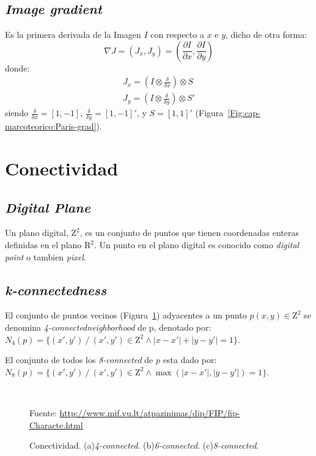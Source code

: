 \subsection{\textit{Image gradient}}
Es la primera derivada de la Imagen $I$ con respecto a $x$ e $y$, dicho de 
otra forma:
\begin{equation}
  \nabla J = (J_x, J_y) = \left( \frac{\partial I}{\partial x}, \frac{\partial I}{\partial y} \right)
\end{equation}
donde:
\begin{eqnarray}
  J_x = \left( I \otimes \frac{\delta}{\delta x} \right) \otimes S \\
  J_y = \left( I \otimes \frac{\delta}{\delta y} \right) \otimes S'
\end{eqnarray}
\noindent siendo $\frac{\delta}{\delta x} = [1, -1]$, $\frac{\delta}{\delta y} = [1, -1]'$, y $S = [1, 1]'$ (Figura~\ref{Fig:cap-marcoteorico:Paris-grad}).

\section{Conectividad}
\subsection{\textit{Digital Plane}}
Un plano digital\cite{Biswas:2010:IsoCovers}, $\mathrm{Z}^2$, es un conjunto 
de puntos que tienen coordenadas enteras definidas en el plano $\mathrm{R}^2$.
Un punto en el plano digital es conocido como \textit{digital point} o tambien
\textit{pixel}.

\subsection{\textit{k-connectedness}}
El conjunto de puntos vecinos (Figura~\ref{Fig:cap-marcoteorico:N-connected}) 
adyacentes a un punto $p(x,y) \in \mathrm{Z}^2$ se denomina 
\textit{4-connectedneighborhood} de p, denotado por: 
$N_4(p) = \lbrace (x', y') ~/~ (x', y') \in \mathrm{Z}^2 \wedge |x - x'| + |y - y'| = 1 \rbrace$. %

El conjunto de todos los \textit{8-connected} de $p$ esta dado por:
$N_8(p) = \lbrace (x', y') ~/~ (x', y') \in \mathrm{Z}^2 \wedge \max ( |x - x'|, |y - y'| ) = 1 \rbrace$.

\begin{figure}[h]
  \centering
   { \, }  
   { }
  \caption[Conectividad]{Conectividad. (a)\textit{4-connected}.
  (b)\textit{6-connected}. (c)\textit{8-connected}.}\tiny{Fuente: 
  \url{http://www.mif.vu.lt/atpazinimas/dip/FIP/fip-Characte.html}}
  \label{Fig:cap-marcoteorico:N-connected}
\end{figure}

